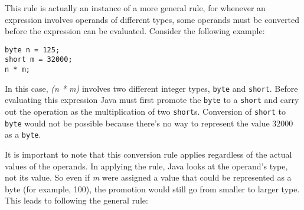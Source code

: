 
\noindent This rule is actually an instance of a more general rule, for whenever
an expression involves operands of different types, some operands must
be converted before the expression can be evaluated.  Consider the
following example:

\begin{jjjlisting}
\begin{lstlisting}
byte n = 125;
short m = 32000;
n * m;
\end{lstlisting}
\end{jjjlisting}

\noindent In this case, {\it (n * m)} involves two
different integer types, {\tt byte} and {\tt short}. Before evaluating
this expression Java must first promote the {\tt byte} to a
{\tt short} and carry out the operation as the multiplication of two
{\tt short}s.  Conversion of {\tt short} to {\tt byte} would not be possible
because there's no way to represent the value 32000 as a {\tt byte}.

It is important to note that this conversion rule applies regardless
of the actual values of the operands.   In applying the rule, Java looks
at the operand's type, not its value.  So even if {\it m} were assigned a
value that could be represented as a byte (for example, 100), the
promotion would still go from smaller to larger type.  This leads to following
the general rule:



